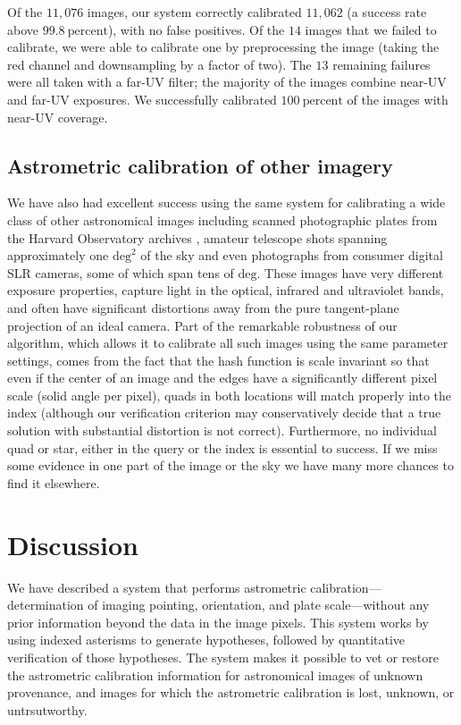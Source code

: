\documentclass[12pt,preprint]{aastex}
\newcommand{\unit}[1]{\mathrm{#1}}
\newcommand{\percent}{\unit{percent}}
\renewcommand{\%}{\percent}
\renewcommand{\deg}{\unit{deg}}
\begin{document}

Of the $11,076$ images, our system correctly calibrated $11,062$ (a
success rate above $99.8~\%$), with no false positives.  Of the $14$
images that we failed to calibrate, we were able to calibrate one by
preprocessing the image (taking the red channel and downsampling by a
factor of two).  The $13$ remaining failures were all taken with a
far-UV filter; the majority of the images combine near-UV and far-UV
exposures.  We successfully calibrated $100~\percent$ of the images
with near-UV coverage.

\subsection{Astrometric calibration of other imagery}

We have also had excellent success using the same system for
calibrating a wide class of other astronomical images including
scanned photographic plates from the Harvard Observatory archives
\citep{harvardplates}, amateur telescope shots spanning approximately
one $\deg^2$ of the sky and even photographs from consumer
digital SLR cameras, some of which span tens of $\deg$. These images
have very different exposure properties, capture light in the optical,
infrared and ultraviolet bands, and often have significant distortions
away from the pure tangent-plane projection of an ideal camera. Part
of the remarkable robustness of our algorithm, which allows it to
calibrate all such images using the same parameter settings, comes
from the fact that the hash function is scale invariant so that even
if the center of an image and the edges have a significantly different
pixel scale (solid angle per pixel), quads in both locations will
match properly into the index (although our verification criterion may
conservatively decide that a true solution with substantial distortion
is not correct). Furthermore, no individual quad or star, either in
the query or the index is essential to success. If we miss some
evidence in one part of the image or the sky we have many more chances
to find it elsewhere.

\section{Discussion}

We have described a system that performs astrometric
calibration---determination of imaging pointing, orientation, and
plate scale---without any prior information beyond the data
in the image pixels.  This system works by using indexed asterisms to
generate hypotheses, followed by quantitative verification of those
hypotheses.  The system makes it possible to vet or restore the
astrometric calibration information for astronomical images of unknown
provenance, and images for which the astrometric calibration is lost,
unknown, or untrsutworthy.
\end{document}
